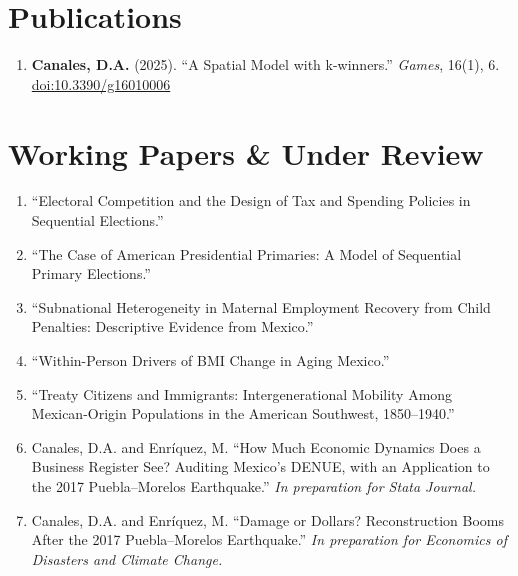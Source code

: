 \documentclass[11pt]{article}
\begin{document}
\section{Publications}
\begin{enumerate}
  \item \textbf{Canales, D.A.} (2025). ``A Spatial Model with k-winners.'' \textit{Games}, 16(1), 6. \href{https://doi.org/10.3390/g16010006}{doi:10.3390/g16010006}
\end{enumerate}

\section{Working Papers \& Under Review}
\begin{enumerate}
  \item ``Electoral Competition and the Design of Tax and Spending Policies in Sequential Elections.''
  \item ``The Case of American Presidential Primaries: A Model of Sequential Primary Elections.''
  \item ``Subnational Heterogeneity in Maternal Employment Recovery from Child Penalties: Descriptive Evidence from Mexico.''
  \item ``Within-Person Drivers of BMI Change in Aging Mexico.''
  \item ``Treaty Citizens and Immigrants: Intergenerational Mobility Among Mexican-Origin Populations in the American Southwest, 1850--1940.''
  \item Canales, D.A. and Enríquez, M. ``How Much Economic Dynamics Does a Business Register See? Auditing Mexico's DENUE, with an Application to the 2017 Puebla--Morelos Earthquake.'' \textit{In preparation for Stata Journal.}
  \item Canales, D.A. and Enríquez, M. ``Damage or Dollars? Reconstruction Booms After the 2017 Puebla--Morelos Earthquake.'' \textit{In preparation for Economics of Disasters and Climate Change.}
\end{enumerate}
\end{document}
